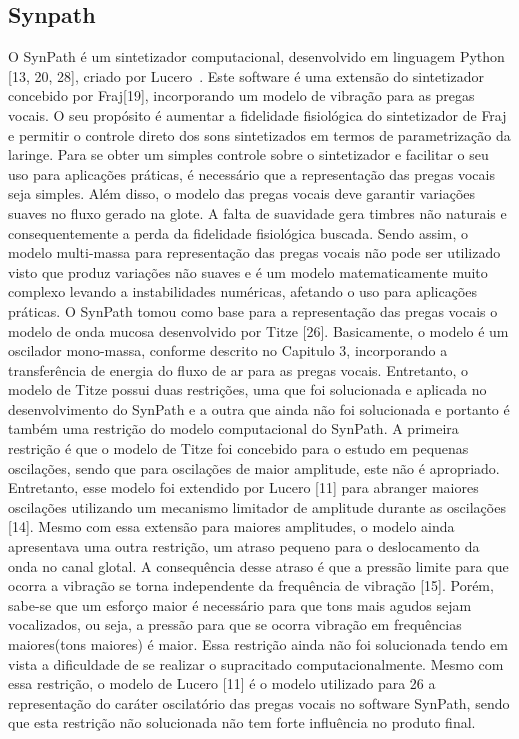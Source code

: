 	
	\subsection{Synpath}
		O SynPath é um sintetizador computacional, desenvolvido em linguagem Python [13, 20, 28], criado por Lucero~\cite{LuceroZueiro1}. Este software é uma extensão do sintetizador concebido por Fraj[19], incorporando um modelo de vibração para as pregas vocais. O seu propósito é aumentar a ﬁdelidade ﬁsiológica do sintetizador de Fraj e permitir o controle direto dos sons sintetizados em termos de parametrização da laringe. Para se obter um simples controle sobre o sintetizador e facilitar o seu uso para aplicações práticas, é necessário que a representação das pregas vocais seja simples. Além disso, o modelo das pregas vocais deve garantir variações suaves no ﬂuxo gerado na glote. A falta de suavidade gera timbres não naturais e consequentemente a perda da ﬁdelidade ﬁsiológica buscada. Sendo assim, o modelo multi-massa para representação das pregas vocais não pode ser utilizado visto que produz variações não suaves e é um modelo matematicamente muito complexo levando a instabilidades numéricas, afetando o uso para aplicações práticas. O SynPath tomou como base para a representação das pregas vocais o modelo de onda mucosa desenvolvido por Titze [26]. Basicamente, o modelo é um oscilador mono-massa, conforme descrito no Capitulo 3, incorporando a transferência de energia do ﬂuxo de ar para as pregas vocais. Entretanto, o modelo de Titze possui duas restrições, uma que foi solucionada e aplicada no desenvolvimento do SynPath e a outra que ainda não foi solucionada e portanto é também uma restrição do modelo computacional do SynPath. A primeira restrição é que o modelo de Titze foi concebido para o estudo em pequenas oscilações, sendo que para oscilações de maior amplitude, este não é apropriado. Entretanto, esse modelo foi extendido por Lucero [11] para abranger maiores oscilações utilizando um mecanismo limitador de amplitude durante as oscilações [14]. Mesmo com essa extensão para maiores amplitudes, o modelo ainda apresentava uma outra restrição, um atraso pequeno para o deslocamento da onda no canal glotal. A consequência desse atraso é que a pressão limite para que ocorra a vibração se torna independente da frequência de vibração [15]. Porém, sabe-se que um esforço maior é necessário para que tons mais agudos sejam vocalizados, ou seja, a pressão para que se ocorra vibração em frequências maiores(tons maiores) é maior. Essa restrição ainda não foi solucionada tendo em vista a diﬁculdade de se realizar o supracitado computacionalmente. Mesmo com essa restrição, o modelo de Lucero [11] é o modelo utilizado para
		26
		a representação do caráter oscilatório das pregas vocais no software SynPath, sendo que esta restrição não solucionada não tem forte inﬂuência no produto ﬁnal.
		
